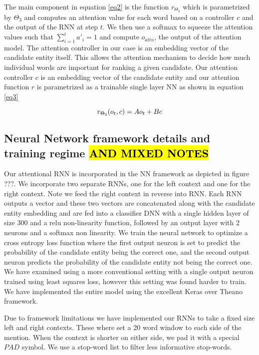 \documentclass[11pt]{article}
\begin{document}
The main component in equation \ref{eq2} is the function $r_{\Theta_3}$ which is parametrized by $\Theta_3$ and computes an attention value for each word based on a controller $c$ and the output of the RNN at step $t$. We then use a softmax to squeeze the attention values such that $\sum_{i=1}^{t} a'_i = 1$ and compute $o_{attn}$, the output of the attention model. The attention controller in our case is an embedding vector of the candidate entity itself. This allows the attention mechanism to decide how much individual words are important for ranking a given candidate. Our attention controller $c$ is an embedding vector of the candidate entity and our attention function $r$ is parametrized as a trainable single layer NN as shown in equation \ref{eq3}

\begin{equation}
\label{eq3}
r_{\Theta_3}(o_t, c) = Ao_t + Bc \\
\end{equation}

\subsection{Neural Network framework details and training regime \hl{AND MIXED NOTES}}
Our attentional RNN is incorporated in the NN framework as depicted in figure ???. We incorporate two separate RNNs, one for the left context and one for the right context. Note we feed the right context in reverse into RNN. Each RNN outputs a vector and these two vectors are concatenated along with the candidate entity embedding and are fed into a classifier DNN with a single hidden layer of size 300 and a relu non-linearity function, followed by an output layer with 2 neurons and a softmax non linearity. We train the neural network to optimize a cross entropy loss function where the first output neuron is set to predict the probability of the candidate entity being the correct one, and the second output neuron predicts the probability of the candidate entity not being the correct one. We have examined using a more conventional setting with a single output neuron trained using least squares loss, however this setting was found harder to train. We have implemented the entire model using the excellent Keras over Theano framework.

Due to framework limitations we have implemented our RNNs to take a fixed size left and right contexts. These where set a 20 word window to each side of the mention. When the context is shorter on either side, we pad it with a special $PAD$ symbol. We use a stop-word list to filter less informative stop-words.
\end{document}
